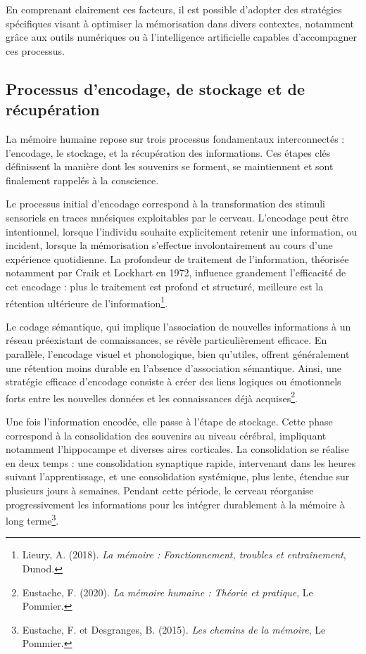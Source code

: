 \documentclass[12pt,a4paper]{report}
\begin{document}
En comprenant clairement ces facteurs, il est possible d’adopter des stratégies spécifiques visant à optimiser la mémorisation dans divers contextes, notamment grâce aux outils numériques ou à l’intelligence artificielle capables d’accompagner ces processus.

\newpage
\subsection{Processus d’encodage, de stockage et de récupération}
La mémoire humaine repose sur trois processus fondamentaux interconnectés : l'encodage, le stockage, et la récupération des informations. Ces étapes clés définissent la manière dont les souvenirs se forment, se maintiennent et sont finalement rappelés à la conscience.

Le processus initial d'encodage correspond à la transformation des stimuli sensoriels en traces mnésiques exploitables par le cerveau. L'encodage peut être intentionnel, lorsque l'individu souhaite explicitement retenir une information, ou incident, lorsque la mémorisation s'effectue involontairement au cours d'une expérience quotidienne. La profondeur de traitement de l'information, théorisée notamment par Craik et Lockhart en 1972, influence grandement l’efficacité de cet encodage : plus le traitement est profond et structuré, meilleure est la rétention ultérieure de l'information\footnote{Lieury, A. (2018). \textit{La mémoire : Fonctionnement, troubles et entraînement}, Dunod.}.

Le codage sémantique, qui implique l'association de nouvelles informations à un réseau préexistant de connaissances, se révèle particulièrement efficace. En parallèle, l'encodage visuel et phonologique, bien qu'utiles, offrent généralement une rétention moins durable en l'absence d'association sémantique. Ainsi, une stratégie efficace d'encodage consiste à créer des liens logiques ou émotionnels forts entre les nouvelles données et les connaissances déjà acquises\footnote{Eustache, F. (2020). \textit{La mémoire humaine : Théorie et pratique}, Le Pommier.}.

Une fois l’information encodée, elle passe à l'étape de stockage. Cette phase correspond à la consolidation des souvenirs au niveau cérébral, impliquant notamment l'hippocampe et diverses aires corticales. La consolidation se réalise en deux temps : une consolidation synaptique rapide, intervenant dans les heures suivant l'apprentissage, et une consolidation systémique, plus lente, étendue sur plusieurs jours à semaines. Pendant cette période, le cerveau réorganise progressivement les informations pour les intégrer durablement à la mémoire à long terme\footnote{Eustache, F. et Desgranges, B. (2015). \textit{Les chemins de la mémoire}, Le Pommier.}.
\end{document}
